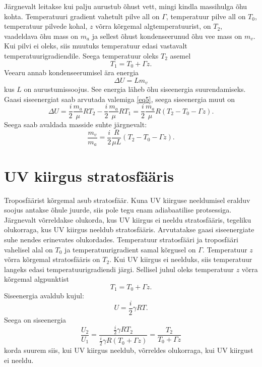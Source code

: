\documentclass{trkut}%
\begin{document}
Järgnevalt leitakse kui palju aurustub õhust vett, mingi kindla massihulga õhu kohta. Temperatuuri gradient vahetult pilve all on $\Gamma$, temperatuur pilve all on $T_0$, temperatuur pilvede kohal, $z$ võrra kõrgemal algtemperatuurist, on $T_2$, vaadeldava õhu mass on $m_a$ ja sellest õhust kondenseerunud õhu vee mass on $m_v$. Kui pilvi ei oleks, siis muutuks temperatuur edasi vastavalt temperatuurigradiendile. Seega temperatuur oleks $T_2$ asemel
\begin{equation}
T_1 = T_0 + \Gamma z.
\end{equation}
Veearu annab kondenseerumisel ära energia
\begin{equation}
\Delta U = L m_v
\end{equation}
kus $L$ on aurustumissoojus. See energia läheb õhu siseenergia suurendamiseks. Gaasi siseenergiat saab arvutada valemiga \ref{eq5}, seega siseenergia muut on
\begin{equation}
\Delta U =\frac{i}{2}\frac{m_a}{\mu}RT_2 - \frac{i}{2}\frac{m_a}{\mu}RT_1  = \frac{i}{2}\frac{m_a}{\mu}R\left(T_2 - T_0 - \Gamma z\right).
\end{equation}
Seega saab avaldada masside suhte järgnevalt:
\begin{equation}
\frac{m_v}{m_a} = \frac{i}{2}\frac{R}{\mu L}\left(T_2- T_0 - \Gamma z\right).
\end{equation}



\section{UV kiirgus stratosfääris}
Troposfäärist kõrgemal asub stratosfäär. Kuna UV kiirguse neeldumisel eralduv soojus antakse õhule juurde, siis pole tegu enam adiabaatilise protsessiga. Järgnevalt võrreldakse olukorda, kus UV kiirgus ei neeldu stratosfääris, tegeliku olukorraga, kus UV kiirgus neeldub stratosfääris. Arvutatakse gaasi siseenergiate suhe nendes erinevates olukordades. Temperatuur stratosfääri ja troposfääri vahelisel alal on $T_0$ ja temperatuurigradient samal kõrgusel on $\Gamma$. Temperatuur $z$ võrra kõrgemal stratosfääris on $T_2$. Kui UV kiirgus ei neelduks, siis temperatuur langeks edasi temperatuurigradiendi järgi. Sellisel juhul oleks temperatuur $z$ võrra kõrgemal algpunktist
\begin{equation}
T_1 = T_0 + \Gamma z.
\end{equation}
Siseenergia avaldub kujul:
\begin{equation}
U = \frac{i}{2}\gamma RT.
\end{equation}
Seega on siseenergia 
\begin{equation}
\frac{U_2}{U_1} = \frac{\frac{i}{2}\gamma RT_2}{\frac{i}{2}\gamma R\left(T_0 + \Gamma z\right)} = \frac{T_2}{T_0+\Gamma z}
\end{equation}
korda suurem siis, kui UV kiirgus neeldub, võrreldes olukorraga, kui UV kiirgust ei neeldu.
\end{document}
